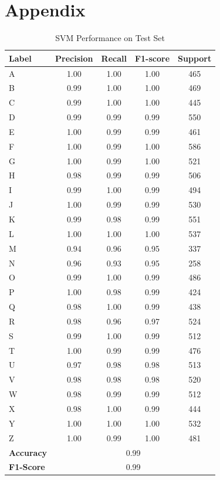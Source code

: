 \section{Appendix}

\begin{table}[H]
\centering
\small
\renewcommand{\arraystretch}{1.2}
\setlength{\tabcolsep}{10pt}
\caption{SVM Performance on Test Set}
\begin{tabular}{|p{2cm}|cccc|}
\hline
\textbf{Label}& \textbf{Precision} & \textbf{Recall} & \textbf{F1-score} & \textbf{Support} \\
\hline
A & 1.00 & 1.00 & 1.00 & 465 \\
B & 0.99 & 1.00 & 1.00 & 469 \\
C & 0.99 & 1.00 & 1.00 & 445 \\
D & 0.99 & 0.99 & 0.99 & 550 \\
E & 1.00 & 0.99 & 0.99 & 461 \\
F & 1.00 & 0.99 & 1.00 & 586 \\
G & 1.00 & 0.99 & 1.00 & 521 \\
H & 0.98 & 0.99 & 0.99 & 506 \\
I & 0.99 & 1.00 & 0.99 & 494 \\
J & 1.00 & 0.99 & 0.99 & 530 \\
K & 0.99 & 0.98 & 0.99 & 551 \\
L & 1.00 & 1.00 & 1.00 & 537 \\
M & 0.94 & 0.96 & 0.95 & 337 \\
N & 0.96 & 0.93 & 0.95 & 258 \\
O & 0.99 & 1.00 & 0.99 & 486 \\
P & 1.00 & 0.98 & 0.99 & 424 \\
Q & 0.98 & 1.00 & 0.99 & 438 \\
R & 0.98 & 0.96 & 0.97 & 524 \\
S & 0.99 & 1.00 & 0.99 & 512 \\
T & 1.00 & 0.99 & 0.99 & 476 \\
U & 0.97 & 0.98 & 0.98 & 513 \\
V & 0.98 & 0.98 & 0.98 & 520 \\
W & 0.98 & 0.99 & 0.99 & 512 \\
X & 0.98 & 1.00 & 0.99 & 444 \\
Y & 1.00 & 1.00 & 1.00 & 532 \\
Z & 1.00 & 0.99 & 1.00 & 481 \\
\hline
\textbf{Accuracy} & \multicolumn{4}{|c|}{0.99} \\
\textbf{F1-Score} & \multicolumn{4}{|c|}{0.99}  \\
\hline
\end{tabular}
\end{table}


